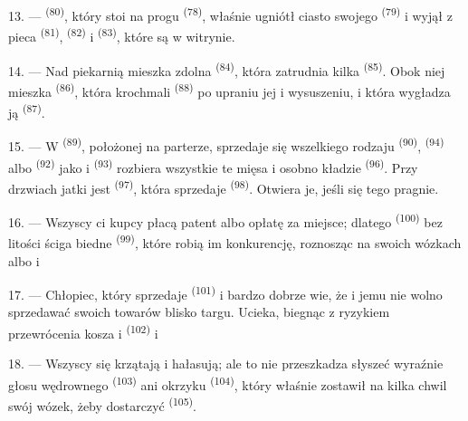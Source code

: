 13. ---  \textsuperscript{(80)}, który stoi na progu 
\textsuperscript{(78)}, właśnie ugniótł ciasto swojego 
\textsuperscript{(79)} i wyjął z pieca  \textsuperscript{(81)},
 \textsuperscript{(82)} i  \textsuperscript{(83)},
które są w witrynie.

14. --- Nad piekarnią mieszka zdolna  \textsuperscript{(84)}, która
zatrudnia kilka  \textsuperscript{(85)}. Obok niej mieszka
 \textsuperscript{(86)}, która krochmali 
\textsuperscript{(88)} po upraniu jej i wysuszeniu, i która wygładza ją
 \textsuperscript{(87)}.

\VUsaut{4.0mm}
\VUsaut{3.0mm}

15. --- W  \textsuperscript{(89)}, położonej na parterze, sprzedaje się
wszelkiego rodzaju  \textsuperscript{(90)}, 
\textsuperscript{(94)} albo  \textsuperscript{(92)} jako  i  
\textsuperscript{(93)} rozbiera wszystkie te mięsa i osobno kładzie  \textsuperscript{(96)}. Przy drzwiach jatki jest 
\textsuperscript{(97)}, która sprzedaje  \textsuperscript{(98)}. Otwiera
je, jeśli się tego pragnie.

16. --- Wszyscy ci kupcy płacą patent albo opłatę za miejsce; dlatego 
\textsuperscript{(100)} bez litości ściga biedne 
\textsuperscript{(99)}, które robią im konkurencję, roznosząc na swoich wózkach
 albo  i 

\VUsaut{4.0mm}
\VUsaut{3.0mm}

17. --- Chłopiec, który sprzedaje  \textsuperscript{(101)} i
 bardzo dobrze wie, że i jemu nie wolno sprzedawać swoich towarów blisko
targu. Ucieka, biegnąc z ryzykiem przewrócenia kosza   i
  \textsuperscript{(102)}  i

18. --- Wszyscy się krzątają i hałasują; ale to nie przeszkadza słyszeć wyraźnie głosu
wędrownego  \textsuperscript{(103)} ani okrzyku 
\textsuperscript{(104)}, który właśnie zostawił na kilka chwil swój wózek, żeby
dostarczyć  \textsuperscript{(105)}.
\VUsaut{6.0mm}
\VUfilet{22mm}
